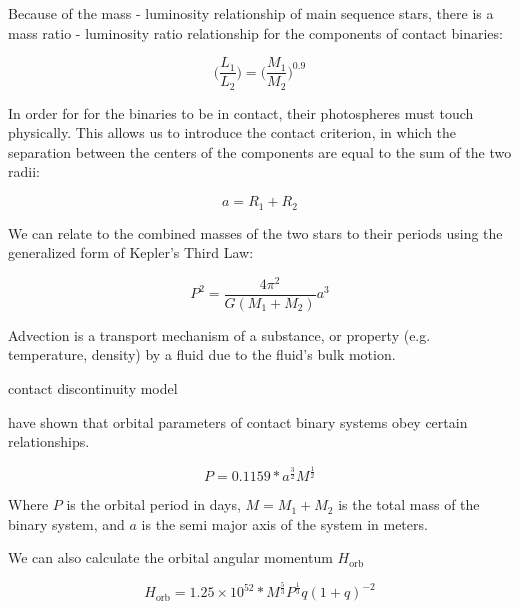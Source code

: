\documentclass[12pt]{article} %
\numberwithin{equation}{section} %
\begin{document}
Because of the mass - luminosity relationship of main sequence stars, there is a mass ratio - luminosity ratio relationship for the components of contact binaries: 

\begin{equation} \label{eqn: luminosity_radius}
\bigg( \frac{L_{1}}{L_{2}} \bigg) = \bigg( \frac{M_{1}}{M_{2}} \bigg)^{0.9}
\end{equation}


In order for for the binaries to be in contact, their photospheres must touch physically. This allows us to introduce the contact criterion, in which the separation between the centers of the components are equal to the sum of the two radii:

\begin{equation} \label{eqn: contact_criterion}
a = R_{1} + R_{2}
\end{equation}

We can relate to the combined masses of the two stars to their periods using the generalized form of Kepler's Third Law: 

\begin{equation} \label{eqn: kepler3}
P^{2} = \frac{4\pi^{2}}{G(M_{1} + M_{2})} a^{3}
\end{equation}

Advection is a transport mechanism of a substance, or property (e.g. temperature, density) by a fluid due to the fluid's bulk motion.

\citep{shu1976structure} contact discontinuity model

\citep{lubow1977structure}

\citet{gazeas2008angular} have shown that orbital parameters of contact binary systems obey certain relationships.

\begin{equation} \label{gazeas2008angular_6}
P = 0.1159 * a^{\frac{3}{2}} M^{\frac{1}{2}}
\end{equation}

Where $P$ is the orbital period in days, $M = M_{1} + M_{2}$ is the total mass of the binary system, and $a$ is the semi major axis of the system in meters.

We can also calculate the orbital angular momentum $H_{\text{orb}}$ 

\begin{equation} \label{gazeas2008angular_7}
H_{\text{orb}} = 1.25 \times 10^{52} * M^{\frac{5}{3}} P^{\frac{1}{3}} q(1 + q)^{-2}
\end{equation}
\end{document}
